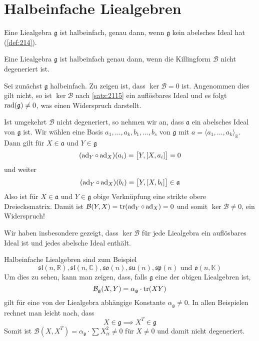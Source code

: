 \section{Halbeinfache Liealgebren} %
\label{sec:22}

\begin{erinnerung}[{name=[halbeinfach]}]
	Eine Liealgebra $\mathfrak{g}$ ist halbeinfach, genau dann, wenn $\mathfrak{g}$ kein abelsches Ideal hat (\ref{def:214}).
\end{erinnerung}

\begin{satz}[{name={Cartan}}]
	Eine Liealgebra $\mathfrak{g}$ ist halbeinfach genau dann, wenn die Killingform $\mathcal{B}$ nicht degeneriert ist.
\end{satz}
\begin{beweis}
	Sei zunächst $\mathfrak{g}$ halbeinfach.
	Zu zeigen ist, dass $\ker \mathcal{B}= 0$ ist.
	Angenommen dies gilt nicht, so ist $\ker \mathcal{B}$ nach \autoref{satz:2115} ein auflösbares Ideal und es folgt $\rad(\mathfrak{g}) \neq 0$, was einen Widerspruch darstellt.
	
	Ist umgekehrt $\mathcal{B}$ nicht degeneriert, so nehmen wir an, dass $\mathfrak{a}$ ein abelsches Ideal von $\mathfrak{g}$ ist.
	Wir wählen eine Basis $a_1, \ldots ,a_k, b_1, \ldots ,b_s$ von $\mathfrak{g}$ mit $a = \langle a_1, \ldots , a_k\rangle_\mathbb{K}$.
	Dann gilt für $X \in \mathfrak{a}$ und $Y \in \mathfrak{g}$ 
	\[
		(\ad_Y \circ \ad_X)(a_i) = \benbrace[\big]{Y,\benbrace*{X,a_i}} = 0
	\]
	und weiter
	\[
		\enbrace*{\ad_Y \circ \ad_X}(b_i) = \benbrace[\big]{Y, \benbrace*{X,b_i}} \in  \mathfrak{a}
	\]
	Also ist für $X \in \mathfrak{a}$ und $Y \in \mathfrak{g}$ obige Verknüpfung eine strikte obere Dreiecksmatrix.
	Damit ist $\mathcal{B}(Y,X)= \tr (\ad_Y \circ \ad_X)=0$ und somit $\ker \mathcal{B} \neq 0$, ein Widerspruch!
\end{beweis}

Wir haben insbesondere gezeigt, dass $\ker \mathcal{B}$ für jede Liealgebra ein auflösbares Ideal ist und jedes abelsche Ideal enthält.

\begin{beispiel*}[{name=[halbeinfache Liealgebren/Liegruppen]}]
	Halbeinfache Liealgebren sind zum Beispiel 
	\[
		\mathfrak{sl}(n,\mathbb{R}), \mathfrak{sl}(n,\mathbb{C}), \mathfrak{so}(n), \mathfrak{su}(n), \mathfrak{sp}(n) \text{ und } \mathfrak{o}(n,\mathbb{K})
	\]
	Um dies zu sehen, kann man zeigen, dass, falls $\mathfrak{g}$ eine der obigen Liealgebren ist,
	\[
		\mathcal{B}_{\mathfrak{g}} \enbrace*{X,Y} = \alpha_\mathfrak{g} \cdot \tr(X Y)
	\]
	gilt für eine von der Liealgebra abhängige Konstante $\alpha_\mathfrak{g} \neq 0$.
	In allen Beispielen rechnet man leicht nach, dass
	\[
		X \in \mathfrak{g} \implies X^T \in \mathfrak{g}
	\]
	Somit ist $\mathcal{B}(X,X^T) = \alpha_\mathfrak{g} \cdot \sum X_{ii}^2 \neq 0$ für $X\neq 0$ und damit nicht degeneriert.
\end{beispiel*}

